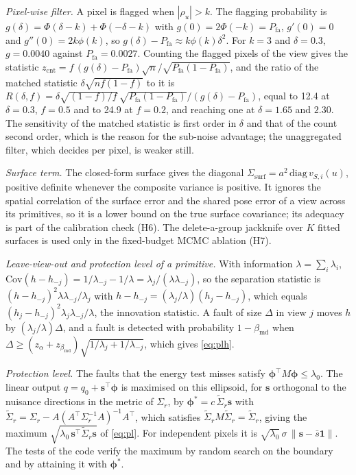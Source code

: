 \emph{Pixel-wise filter.} A pixel is flagged when $|\rho_u|>k$. The flagging probability is
$g(\delta)=\Phi(\delta-k)+\Phi(-\delta-k)$ with $g(0)=2\Phi(-k)=P_{\mathrm{fa}}$, $g'(0)=0$ and
$g''(0)=2k\phi(k)$, so $g(\delta)-P_{\mathrm{fa}}\approx k\phi(k)\delta^{2}$. For $k=3$ and $\delta=0.3$,
$g=0.0040$ against $P_{\mathrm{fa}}=0.0027$. Counting the flagged pixels of the view gives the statistic
$z_{\mathrm{cnt}}=f\,(g(\delta)-P_{\mathrm{fa}})\sqrt{n}/\sqrt{P_{\mathrm{fa}}(1-P_{\mathrm{fa}})}$, and the ratio of the
matched statistic $\delta\sqrt{nf(1-f)}$ to it is
$R(\delta,f)=\delta\sqrt{(1-f)/f}\,\sqrt{P_{\mathrm{fa}}(1-P_{\mathrm{fa}})}/(g(\delta)-P_{\mathrm{fa}})$, equal to
12.4 at $\delta=0.3$, $f=0.5$ and to 24.9 at $f=0.2$, and reaching one at $\delta=1.65$ and $2.30$.
The sensitivity of the matched statistic is first order in $\delta$ and that of the count second order,
which is the reason for the sub-noise advantage; the unaggregated filter, which decides per pixel, is
weaker still.

\emph{Surface term.} The closed-form surface gives the diagonal
$\Sigma_{\mathrm{surf}}=a^{2}\,\mathrm{diag}\,v_{S,i}(u)$, positive definite whenever the composite
variance is positive. It ignores the spatial correlation of the surface error and the shared pose
error of a view across its primitives, so it is a lower bound on the true surface covariance;
its adequacy is part of the calibration check (H6). The delete-a-group jackknife over $K$
fitted surfaces is used only in the fixed-budget MCMC ablation (H7).

\emph{Leave-view-out and protection level of a primitive.} With information $\lambda=\sum_i\lambda_i$,
$\mathrm{Cov}(h-h_{-j})=1/\lambda_{-j}-1/\lambda=\lambda_j/(\lambda\lambda_{-j})$, so the
separation statistic is $(h-h_{-j})^{2}\lambda\lambda_{-j}/\lambda_j$ with
$h-h_{-j}=(\lambda_j/\lambda)(h_j-h_{-j})$, which equals $(h_j-h_{-j})^{2}\lambda_j\lambda_{-j}/\lambda$, the innovation statistic.
A fault of size $\Delta$ in view $j$ moves $h$ by $(\lambda_j/\lambda)\Delta$, and a fault is
detected with probability $1-\beta_{\mathrm{md}}$ when
$\Delta\ge(z_\alpha+z_{\beta_{\mathrm{md}}})\sqrt{1/\lambda_j+1/\lambda_{-j}}$, which gives \eqref{eq:plh}.

\emph{Protection level.} The faults that the energy test misses satisfy
$\boldsymbol\phi^{\top}M\boldsymbol\phi\le\lambda_0$. The linear output $q=q_0+\mathbf{s}^{\top}\boldsymbol\phi$ is
maximised on this ellipsoid, for $\mathbf{s}$ orthogonal to the nuisance directions in the metric of
$\Sigma_r$, by $\boldsymbol\phi^{*}=c\,\tilde\Sigma_r\mathbf{s}$ with $\tilde\Sigma_r=\Sigma_r-A(A^{\top}\Sigma_r^{-1}A)^{-1}A^{\top}$,
which satisfies $\tilde\Sigma_rM\tilde\Sigma_r=\tilde\Sigma_r$, giving the maximum
$\sqrt{\lambda_0\,\mathbf{s}^{\top}\tilde\Sigma_r\mathbf{s}}$ of \eqref{eq:pl}. For independent pixels it is
$\sqrt{\lambda_0}\,\sigma\,\|\mathbf{s}-\bar{s}\mathbf{1}\|$. The tests of the code verify the maximum by random
search on the boundary and by attaining it with $\boldsymbol\phi^{*}$.
